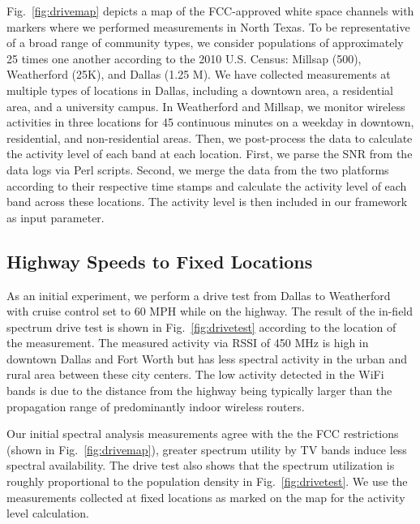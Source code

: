 Fig.~\ref{fig:drivemap} depicts a map of the FCC-approved white space channels with markers where we performed 
measurements in North Texas. To be representative of a broad range of community types, we consider populations of 
approximately 25 times one another according to the 2010 U.S. Census: Millsap (500), Weatherford (25K), and Dallas 
(1.25 M). We have collected measurements at multiple types of locations in Dallas, including a downtown area,
a residential area, and a university campus. In Weatherford and Millsap, we monitor wireless activities in three 
locations for 45 continuous minutes on a weekday in downtown, residential, and non-residential areas. Then, we 
post-process the data to calculate the activity level of each band at each location. First, we parse the SNR from 
the data logs via Perl scripts. Second, we merge the data from the two platforms according to their respective 
time stamps and calculate the activity level of each band across these locations. The activity level is then 
included in our framework as input parameter. 

\subsection{Highway Speeds to Fixed Locations} 
\label{subsec:measurementresult}
As an initial experiment, we perform a drive test from Dallas to Weatherford with cruise control set to 60 MPH while 
on the highway. The result of the in-field spectrum drive test is shown in Fig.~\ref{fig:drivetest} according to 
the location of the measurement. The measured activity via RSSI of 450 MHz is high in downtown Dallas and 
Fort Worth but has less spectral activity in the urban and rural area between these city centers. The low activity 
detected in the WiFi bands is due to the distance from the highway being typically larger than the propagation range 
of predominantly indoor wireless routers.

Our initial spectral analysis measurements agree with the the FCC restrictions (shown in Fig.~\ref{fig:drivemap}), 
greater spectrum utility by TV bands induce less spectral availability.
The drive test also shows that the spectrum 
utilization is roughly proportional to the population density in Fig.~\ref{fig:drivetest}. We use the measurements 
collected at fixed locations as marked on the map for the activity level calculation. 

